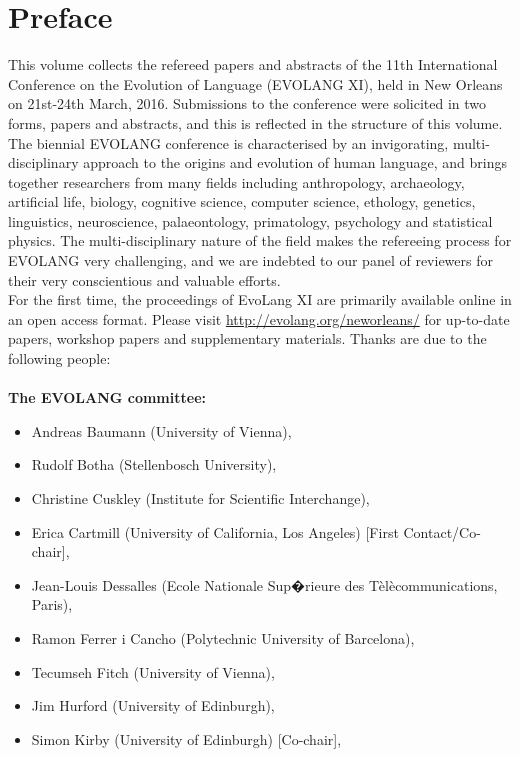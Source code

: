 \documentclass{evolang9_book}
\begin{document}
\chapter*{Preface}
{%
This volume collects the refereed papers and abstracts of the 11th International Conference on the Evolution of Language (EVOLANG XI), held in New Orleans on 21st-24th March, 2016.  Submissions to the conference were solicited in two forms, papers and abstracts, and this is reflected in the structure of this volume.
\\
The biennial EVOLANG conference is characterised by an invigorating, multi-disciplinary approach to the origins and evolution of human language, and brings together researchers from many fields including anthropology, archaeology, artificial life, biology, cognitive science, computer science, ethology, genetics, linguistics, neuroscience, palaeontology, primatology, psychology and statistical physics.  The multi-disciplinary nature of the field makes the refereeing process for EVOLANG very challenging, and we are indebted to our panel of reviewers for their very conscientious and valuable efforts.
\\
For the first time, the proceedings of EvoLang XI are primarily available online in an open access format.  Please visit \url{http://evolang.org/neworleans/} for up-to-date papers, workshop papers and supplementary materials.  Thanks are due to the following people:\\\\
%
\textbf{The EVOLANG committee:}
    \begin{itemize}
\item Andreas Baumann (University of Vienna),
\item    Rudolf Botha (Stellenbosch University),
\item    Christine Cuskley (Institute for Scientific Interchange),
\item    Erica Cartmill (University of California, Los Angeles) [First Contact/Co-chair],
\item    Jean-Louis Dessalles (Ecole Nationale Sup�rieure des T\`{e}l\`{e}communications, Paris),
\item    Ramon Ferrer i Cancho (Polytechnic University of Barcelona),
\item    Tecumseh Fitch (University of Vienna),
\item    Jim Hurford (University of Edinburgh),
\item    Simon Kirby (University of Edinburgh) [Co-chair],

\end{itemize}}
\end{document}
